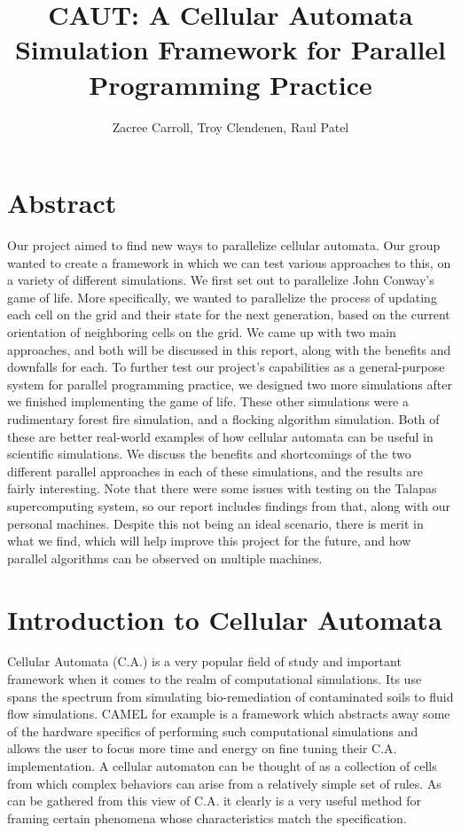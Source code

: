 \documentclass[12pt]{article}
\begin{document}
\title{CAUT: A Cellular Automata Simulation Framework for Parallel Programming Practice}
\author{Zacree Carroll, Troy Clendenen, Raul Patel}
\maketitle

\section{Abstract}
Our project aimed to find new ways to parallelize cellular automata. Our group wanted to create a framework in which we can test various approaches to this, on a variety of different simulations. We first set out to parallelize John Conway's game of life. More specifically, we wanted to parallelize the process of updating each cell on the grid and their state for the next generation, based on the current orientation of neighboring cells on the grid. We came up with two main approaches, and both will be discussed in this report, along with the benefits and downfalls for each. To further test our project's capabilities as a general-purpose system for parallel programming practice, we designed two more simulations after we finished implementing the game of life. These other simulations were a rudimentary forest fire simulation, and a flocking algorithm simulation. Both of these are better real-world examples of how cellular automata can be useful in scientific simulations. We discuss the benefits and shortcomings of the two different parallel approaches in each of these simulations, and the results are fairly interesting. Note that there were some issues with testing on the Talapas supercomputing system, so our report includes findings from that, along with our personal machines. Despite this not being an ideal scenario, there is merit in what we find, which will help improve this project for the future, and how parallel algorithms can be observed on multiple machines.

\section{Introduction to Cellular Automata}
Cellular Automata (C.A.) is a very popular field of study and important framework when it comes to the realm of computational simulations. Its use spans the spectrum from simulating bio-remediation of contaminated soils to fluid flow simulations. CAMEL for example is a framework which abstracts away some of the hardware specifics of performing such computational simulations and allows the user to focus more time and energy on fine tuning their C.A. implementation. \cite{Cann95} A cellular automaton can be thought of as a collection of cells from which complex behaviors can arise from a relatively simple set of rules. As can be gathered from this view of C.A. it clearly is a very useful method for framing certain phenomena whose characteristics match the specification.
\end{document}
